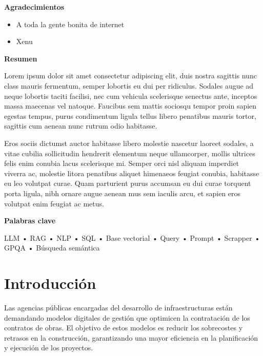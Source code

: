 \documentclass{article}
\begin{document}
{\bfseries\LARGE Agradecimientos \par}
\begin{itemize}
  \item A toda la gente bonita de internet
  \item Xenu
\end{itemize}
\newpage

{\bfseries\LARGE Resumen \par}
Lorem ipsum dolor sit amet consectetur adipiscing elit, duis nostra sagittis nunc class mauris fermentum, semper lobortis eu dui per ridiculus. Sodales augue ad neque lobortis taciti facilisi, nec cum vehicula scelerisque senectus ante, inceptos massa maecenas vel natoque. Faucibus sem mattis sociosqu tempor proin sapien egestas tempus, purus condimentum ligula tellus libero penatibus mauris tortor, sagittis cum aenean nunc rutrum odio habitasse.

Eros sociis dictumst auctor habitasse libero molestie nascetur laoreet sodales, a vitae cubilia sollicitudin hendrerit elementum neque ullamcorper, mollis ultrices felis enim conubia lacus scelerisque mi. Semper orci nisl aliquam imperdiet viverra ac, molestie litora penatibus aliquet himenaeos feugiat conubia, habitasse eu leo volutpat curae. Quam parturient purus accumsan eu dui curae torquent porta ligula, nibh ornare augue aenean mus sem iaculis arcu, et sapien eros volutpat enim feugiat ac metus.

\vspace{1cm}

{\bfseries Palabras clave \par}
\vspace{0.25cm}
LLM • RAG • NLP • SQL • Base vectorial • Query • Prompt • Scrapper • GPQA • Búsqueda semántica
\newpage

{\Large %
\tableofcontents
}\newpage


\section{Introducción}
Las agencias públicas encargadas del desarrollo de infraestructuras están demandando modelos digitales de gestión que optimicen la contratación de los contratos de obras. El objetivo de estos modelos es reducir los sobrecostes y retrasos en la construcción, garantizando una mayor eficiencia en la planificación y ejecución de los proyectos.
\end{document}

